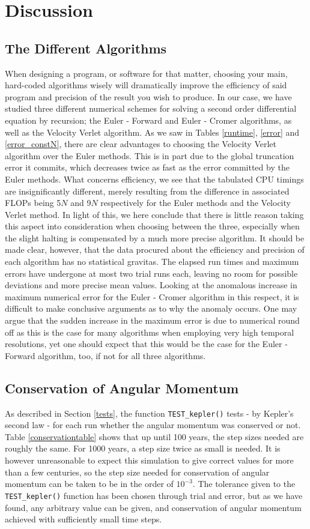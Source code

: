 \section{Discussion}
\subsection{The Different Algorithms}
When designing a program, or software for that matter, choosing your main, hard-coded algorithms wisely will dramatically improve the efficiency of said program and precision of the result you wish to produce. In our case, we have studied three different numerical schemes for solving a second order differential equation by recursion; the Euler - Forward and Euler - Cromer algorithms, as well as the Velocity Verlet algorithm. As we saw in Tables \ref{runtime}, \ref{error} and \ref{error_constN}, there are clear advantages to choosing the Velocity Verlet algorithm over the Euler methods. This is in part due to the global truncation error it commits, which decreases twice as fast as the error committed by the Euler methods. What concerns efficiency, we see that the tabulated CPU timings are insignificantly different, merely resulting from the difference in associated FLOPs being 5$N$ and 9$N$ respectively for the Euler methods and the Velocity Verlet method. In light of this, we here conclude that there is little reason taking this aspect into consideration when choosing between the three, especially when the slight halting is compensated by a much more precise algorithm. It should be made clear, however, that the data procured about the efficiency and precision of each algorithm has no statistical gravitas. The elapsed run times and maximum errors have undergone at most two trial runs each, leaving no room for possible deviations and more precise mean values. Looking at the anomalous increase in maximum numerical error for the Euler - Cromer algorithm in this respect, it is difficult to make conclusive arguments as to why the anomaly occurs. One may argue that the sudden increase in the maximum error is due to numerical round off as this is the case for many algorithms when employing very high temporal resolutions, yet one should expect that this would be the case for the Euler - Forward algorithm, too, if not for all three algorithms. 
\subsection{Conservation of Angular Momentum}
As described in Section \ref{tests}, the function \texttt{TEST\_kepler()} tests - by Kepler's second law - for each run whether the angular momentum was conserved or not. Table \ref{conservationtable} shows that up until 100 years, the step sizes needed are roughly the same. For 1000 years, a step size twice as small is needed. It is however unreasonable to expect this simulation to give correct values for more than a few centuries, so the step size needed for conservation of angular momentum can be taken to be in the order of $10^{-3}$. The tolerance given to the \texttt{TEST\_kepler()} function has been chosen through trial and error, but as we have found, any arbitrary value can be given, and conservation of angular momentum achieved with sufficiently small time steps.

